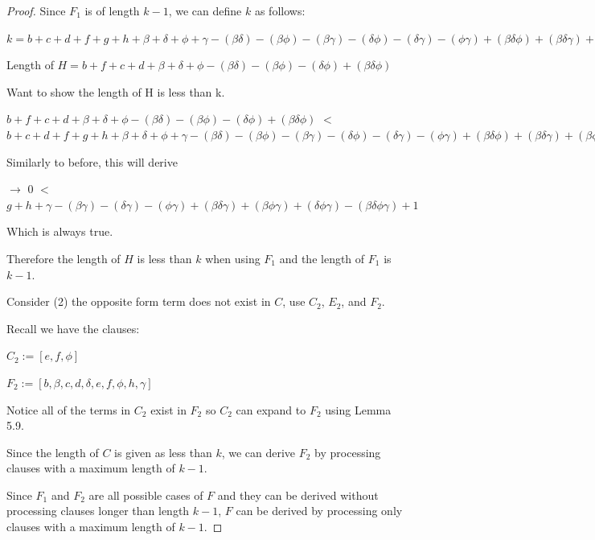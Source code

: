 \documentclass[manuscript]{acmart}
\begin{document}
\begin{proof}
        Since $F_1$ is of length $k - 1$, we can define $k$ as follows:

        $k = b + c + d + f + g + h 
        + \beta + \delta + \phi + \gamma
        - (\beta \delta) - (\beta \phi) - (\beta \gamma) - (\delta \phi) - (\delta \gamma) - (\phi \gamma)
        + (\beta \delta \phi) + (\beta \delta \gamma) + (\beta \phi \gamma) + (\delta \phi \gamma)
        - (\beta \delta \phi \gamma)
        + 1
        $

        Length of $H = b + f + c + d 
        + \beta + \delta + \phi
        - (\beta \delta) - (\beta \phi) - (\delta \phi)
        + (\beta \delta \phi) $

        Want to show the length of H is less than k.

        $b + f + c + d 
        + \beta + \delta + \phi
        - (\beta \delta) - (\beta \phi) - (\delta \phi)
        + (\beta \delta \phi) $
        $<$
        $b + c + d + f + g + h 
        + \beta + \delta + \phi + \gamma
        - (\beta \delta) - (\beta \phi) - (\beta \gamma) - (\delta \phi) - (\delta \gamma) - (\phi \gamma)
        + (\beta \delta \phi) + (\beta \delta \gamma) + (\beta \phi \gamma) + (\delta \phi \gamma)
        - (\beta \delta \phi \gamma)
        + 1
        $

        Similarly to before, this will derive 

        $\rightarrow$
        $0$
        $<$
        $g + h 
        + \gamma
        - (\beta \gamma) - (\delta \gamma) - (\phi \gamma)
        + (\beta \delta \gamma) + (\beta \phi \gamma) + (\delta \phi \gamma)
        - (\beta \delta \phi \gamma)
        + 1
        $

        Which is always true.
        
        Therefore the length of $H$ is less than $k$ when using $F_1$ and the length of $F_1$ is $k - 1$.

        Consider (2) the opposite form term does not exist in $C$, use $C_2$, $E_2$, and $F_2$.

        Recall we have the clauses:

        $C_2 := [e, f, \phi]$

        $F_2 := [b, \beta, c, d, \delta, e, f, \phi, h, \gamma]$

        Notice all of the terms in $C_2$ exist in $F_2$ so $C_2$ can expand to $F_2$ using Lemma 5.9.

        Since the length of $C$ is given as less than $k$, we can derive $F_2$ by processing clauses with a maximum length of $k - 1$.

        Since $F_1$ and $F_2$ are all possible cases of $F$ and they can be derived without processing clauses longer than length $k-1$, $F$ can be derived by processing only clauses with a maximum length of $k-1$.
    \end{proof}
\end{document}
